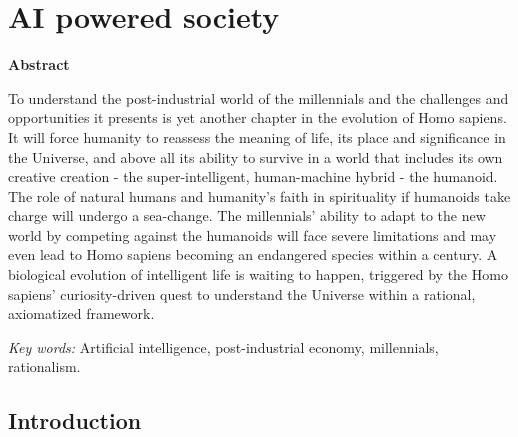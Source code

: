 \chapter*{AI powered society}


\begin{multicols}{2}
\begin{center}
\bf{Abstract}
\end{center}

To understand the post-industrial world of the millennials and the challenges and opportunities it presents
is yet another chapter in the evolution of Homo sapiens. It will force humanity to reassess the meaning of
life, its place and significance in the Universe, and above all its ability to survive in a world that includes its
own creative creation - the super-intelligent, human-machine hybrid - the humanoid. The role of natural
humans and humanity's faith in spirituality if humanoids take charge will undergo a sea-change. The
millennials' ability to adapt to the new world by competing against the humanoids will face severe
limitations and may even lead to Homo sapiens becoming an endangered species within a century. A
biological evolution of intelligent life is waiting to happen, triggered by the Homo sapiens’ curiosity-driven
quest to understand the Universe within a rational, axiomatized framework.

\textit{Key words:} Artificial intelligence, post-industrial economy, millennials, rationalism.

\section{Introduction}


\end{multicols}
